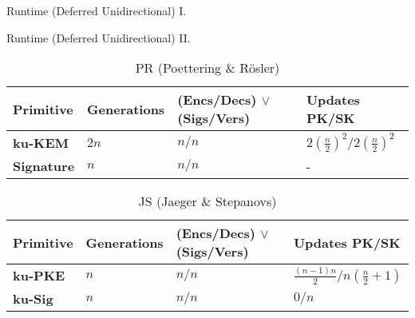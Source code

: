 \documentclass{beamer}
\begin{document}
\begin{frame}{Runtime (Deferred Unidirectional) I.}
 \begin{figure}[H]
    \centering
     
  \end{figure}
\end{frame}

\begin{frame}{Runtime (Deferred Unidirectional) II.}
  \scriptsize
  \begin{table}
    \caption*{PR (Poettering \& Rösler)}
    \begin{tabular}{ | l | l | l | l |}
    \hline
    Primitive & Generations & (Encs/Decs) $\vee$ (Sigs/Vers) & Updates PK/SK \\ \hline
    \textbf{ku-KEM} & $2n$ & $n/n$ & $2(\frac{n}{2})^2/2(\frac{n}{2})^2$ \\ \hline
    \textbf{Signature} & $n$ & $n/n$ & - \\  
    \hline
    \end{tabular}
  \end{table}
  \begin{table}
    \caption*{JS (Jaeger \& Stepanovs)}
    \begin{tabular}{ | l | l | l | l |}
    \hline
    Primitive & Generations & (Encs/Decs) $\vee$ (Sigs/Vers) & Updates PK/SK \\ \hline
    \textbf{ku-PKE} & $n$ & $n/n$ & $\frac{(n-1)n}{2}/n(\frac{n}{2}+1)$ \\ \hline
    \textbf{ku-Sig} & $n$ & $n/n$ & $0/n$ \\  
    \hline
    \end{tabular}
  \end{table}
\end{frame}
\end{document}
